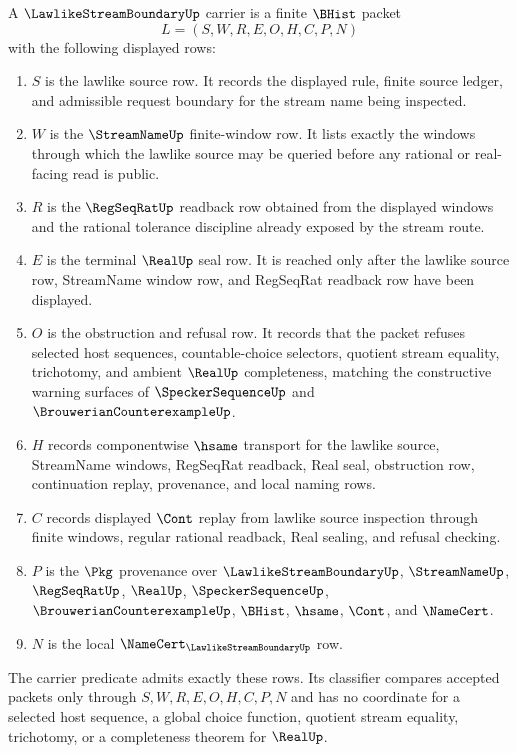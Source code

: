 \begin{definition}
\label{def:lawlike-stream-boundary-carrier}
A $\LawlikeStreamBoundaryUp$ carrier is a finite $\BHist$ packet
$$
L=(S,W,R,E,O,H,C,P,N)
$$
with the following displayed rows:
\begin{enumerate}
\item $S$ is the lawlike source row. It records the displayed rule, finite source ledger, and admissible request boundary for the stream name being inspected.
\item $W$ is the $\StreamNameUp$ finite-window row. It lists exactly the windows through which the lawlike source may be queried before any rational or real-facing read is public.
\item $R$ is the $\RegSeqRatUp$ readback row obtained from the displayed windows and the rational tolerance discipline already exposed by the stream route.
\item $E$ is the terminal $\RealUp$ seal row. It is reached only after the lawlike source row, StreamName window row, and RegSeqRat readback row have been displayed.
\item $O$ is the obstruction and refusal row. It records that the packet refuses selected host sequences, countable-choice selectors, quotient stream equality, trichotomy, and ambient $\RealUp$ completeness, matching the constructive warning surfaces of $\SpeckerSequenceUp$ and $\BrouwerianCounterexampleUp$.
\item $H$ records componentwise $\hsame$ transport for the lawlike source, StreamName windows, RegSeqRat readback, Real seal, obstruction row, continuation replay, provenance, and local naming rows.
\item $C$ records displayed $\Cont$ replay from lawlike source inspection through finite windows, regular rational readback, Real sealing, and refusal checking.
\item $P$ is the $\Pkg$ provenance over $\LawlikeStreamBoundaryUp$, $\StreamNameUp$, $\RegSeqRatUp$, $\RealUp$, $\SpeckerSequenceUp$, $\BrouwerianCounterexampleUp$, $\BHist$, $\hsame$, $\Cont$, and $\NameCert$.
\item $N$ is the local $\NameCert_{\LawlikeStreamBoundaryUp}$ row.
\end{enumerate}
The carrier predicate admits exactly these rows. Its classifier compares accepted packets only through $S,W,R,E,O,H,C,P,N$ and has no coordinate for a selected host sequence, a global choice function, quotient stream equality, trichotomy, or a completeness theorem for $\RealUp$.
\end{definition}

